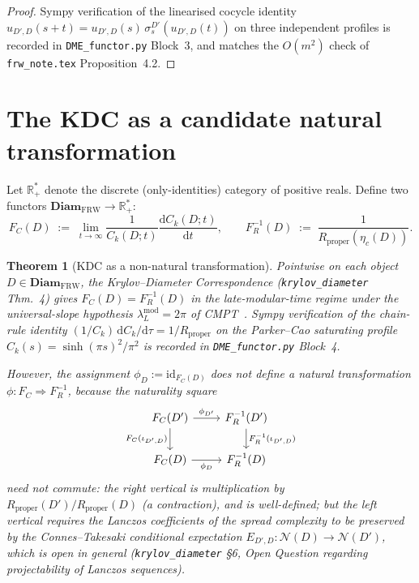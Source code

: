 \documentclass[11pt]{article}
\newtheorem{theorem}{Theorem}
\newcommand{\NN}{\mathcal{N}}
\newcommand{\FRW}{{\mathrm{FRW}}}
\newcommand{\R}{\mathbb{R}}
\newcommand{\Rprop}{R_{\mathrm{proper}}}
\newcommand{\Diam}{\mathbf{Diam}_\FRW}
\begin{document}
\begin{proof}
Sympy verification of the linearised cocycle identity
$u_{D',D}(s+t)=u_{D',D}(s)\,\sigma^{D'}_s(u_{D',D}(t))$ on three
independent profiles is recorded in \texttt{DME\_functor.py}
Block~3, and matches the $O(m^2)$ check of \texttt{frw\_note.tex}
Proposition~4.2.
\end{proof}

\section{The KDC as a candidate natural transformation}\label{sec:nat}

Let $\R^*_+$ denote the discrete (only-identities) category of
positive reals. Define two functors $\Diam\to\R^*_+$:
\[
F_C(D) \;:=\; \lim_{t\to\infty}\frac{1}{C_k(D;t)}\frac{\mathrm{d}C_k(D;t)}{\mathrm{d}t},
\qquad
F_R^{-1}(D) \;:=\; \frac{1}{\Rprop(\eta_c(D))}.
\]

\begin{theorem}[KDC as a non-natural transformation]\label{thm:KDC-nat}
Pointwise on each object $D\in\Diam$, the Krylov--Diameter
Correspondence (\texttt{krylov\_diameter} Thm.~4) gives
$F_C(D)=F_R^{-1}(D)$ in the late-modular-time regime under the
universal-slope hypothesis $\lambda_L^{\mathrm{mod}}=2\pi$ of
CMPT~\cite{CMPT24}. Sympy verification of the chain-rule identity
$(1/C_k)\,\mathrm{d}C_k/\mathrm{d}\tau=1/\Rprop$ on the
Parker--Cao saturating profile $C_k(s)=\sinh(\pi s)^2/\pi^2$ is
recorded in \texttt{DME\_functor.py} Block~4.

However, the assignment $\phi_D := \mathrm{id}_{F_C(D)}$ does
\emph{not} define a natural transformation $\phi:F_C\Rightarrow
F_R^{-1}$, because the naturality square
\[
\begin{tikzcd}
F_C(D') \arrow[r, "\phi_{D'}"] \arrow[d, "F_C(\iota_{D',D})"'] & F_R^{-1}(D') \arrow[d, "F_R^{-1}(\iota_{D',D})"] \\
F_C(D) \arrow[r, "\phi_D"'] & F_R^{-1}(D)
\end{tikzcd}
\]
need not commute: the right vertical is multiplication by
$\Rprop(D')/\Rprop(D)$ (a contraction), and is well-defined; but
the left vertical requires the Lanczos coefficients of the spread
complexity to be preserved by the Connes--Takesaki conditional
expectation $E_{D',D}:\NN(D)\to\NN(D')$, which is open in general
(\texttt{krylov\_diameter} \S6, Open Question regarding
projectability of Lanczos sequences).
\end{theorem}
\end{document}
